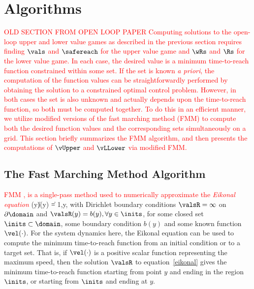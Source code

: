\section{Algorithms}
\label{sec:algorithms}
\textcolor{red}{OLD SECTION FROM OPEN LOOP PAPER
Computing solutions to the open-loop upper and lower value games as described in the previous section requires finding $\vals$ and $\safereach$ for the upper value game and $\wRs$ and $\Rs$ for the lower value game.
In each case, the desired value is a minimum time-to-reach function constrained within some set.
If the set is known \emph{a priori}, the computation of the function values can be straightforwardly performed by obtaining the solution to a constrained optimal control problem. 
However, in both cases the set is also unknown and actually depends upon the time-to-reach function, so both must be computed together.
To do this in an efficient manner, we utilize modified versions of the fast marching method (FMM) to compute both the desired function values and the corresponding sets simultaneously on a grid.
This section briefly summarizes the FMM algorithm, and then presents the computations of $\vUpper$ and $\vLLower$ via modified FMM.}

\subsection{The Fast Marching Method Algorithm}
\textcolor{red}{
FMM \cite{SethSIAM, SethianBook, falconeLecture}, is a single-pass method used to numerically approximate the \emph{Eikonal equation}}
\vspace{-0.1cm}
\bq\label{eikonal}
\vel(y)\|\nabla \valsR (y) \| = 1,\quad y\in\domain\setminus \inits,
\eq
with Dirichlet boundary conditions $\valsR=\infty$ on $\partial\domain$ and $\valsR(y)=b(y),\forall y\in\inits$, for some closed set $\inits \subset\domain$, some boundary condition $b(y)$ and some known function $\vel(\cdot)$. 
For the system dynamics here, the Eikonal equation can be used to compute the minimum time-to-reach function from an initial condition or to a target set.
That is, if $\vel(\cdot)$ is a positive scalar function representing the maximum speed, then the solution $\valsR$ to equation~\eqref{eikonal} gives the minimum time-to-reach function starting from point $y$ and ending in the region $\inits$, or starting from $\inits$ and ending at $y$. 

